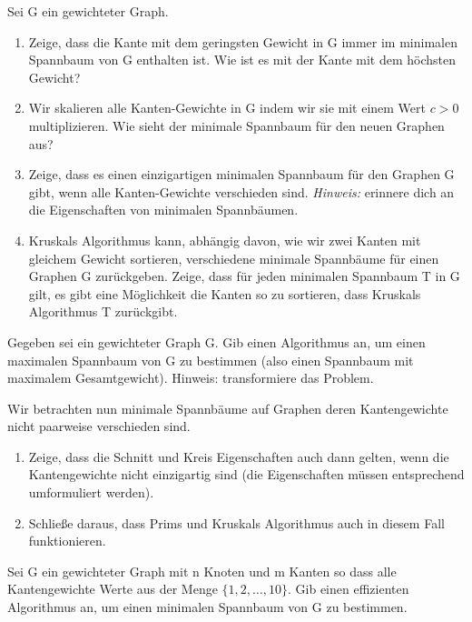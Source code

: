 \documentclass{uebung_cs}
\begin{document}
\begin{aufgabe}
	Sei G ein gewichteter Graph.
	\begin{enumerate}
		\item Zeige, dass die Kante mit dem geringsten Gewicht in G immer im minimalen Spannbaum von G enthalten ist.
		Wie ist es mit der Kante mit dem höchsten Gewicht? 
		\item Wir skalieren alle Kanten-Gewichte in G indem wir sie mit einem Wert $c>0$ multiplizieren.
		Wie sieht der minimale Spannbaum für den neuen Graphen aus?
		\item Zeige, dass es einen einzigartigen minimalen Spannbaum für den Graphen G gibt, wenn alle Kanten-Gewichte verschieden sind.
		\textit{Hinweis:} erinnere dich an die Eigenschaften von minimalen Spannbäumen.
		\item Kruskals Algorithmus kann, abhängig davon, wie wir zwei Kanten mit gleichem Gewicht sortieren, verschiedene minimale Spannbäume für einen Graphen G zurückgeben.
		Zeige, dass für jeden minimalen Spannbaum T in G gilt, es gibt eine Möglichkeit die Kanten so zu sortieren, dass Kruskals Algorithmus T zurückgibt.
	\end{enumerate}
\end{aufgabe}


\begin{aufgabe}
	Gegeben sei ein gewichteter Graph G. Gib einen Algorithmus an, um einen maximalen Spannbaum von G zu bestimmen (also einen Spannbaum mit maximalem Gesamtgewicht).
	Hinweis: transformiere das Problem.
\end{aufgabe}


\begin{aufgabe}
	Wir betrachten nun minimale Spannbäume auf Graphen deren Kantengewichte nicht paarweise verschieden sind.
	\begin{enumerate}
		\item Zeige, dass die Schnitt und Kreis Eigenschaften auch dann gelten, wenn die Kantengewichte nicht einzigartig sind (die Eigenschaften müssen entsprechend umformuliert werden).
		\item Schließe daraus, dass Prims und Kruskals Algorithmus auch in diesem Fall funktionieren.
	\end{enumerate}
\end{aufgabe}

\begin{aufgabe}
	Sei G ein gewichteter Graph mit n Knoten und m Kanten so dass alle Kantengewichte Werte aus der Menge $\{ 1, 2, \ldots , 10\}$.
	Gib einen effizienten Algorithmus an, um einen minimalen Spannbaum von G zu bestimmen.
\end{aufgabe}
\end{document}
